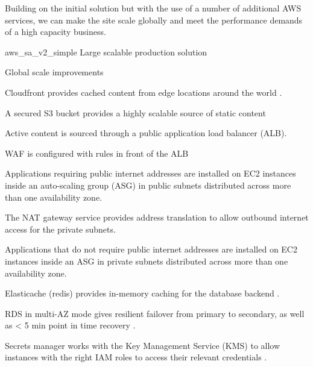 
	
Building on the initial solution but with the use of a number of additional AWS services, we can make the site scale globally and meet the performance demands of a high capacity business.
	

\architecture
{aws_sa_v2_simple}
{Large scalable production solution}

\changes
{Global scale improvements}
{
\item \label{item:aws_sa_v2_simple_cloudfront} Cloudfront provides cached content from edge locations around the world \cite{cfn-api}. 
\item \label{item:aws_sa_v2_simple_s3_origin} A secured S3 bucket provides a highly scalable source of static content
\item \label{item:aws_sa_v2_simple_alb} Active content is sourced through a public application load balancer (ALB).
\item \label{item:aws_sa_v2_simple_waf} WAF is configured with rules in front of the ALB \cite{ AWS-shield, waf-apiref, waf-dg}
\item \label{item:aws_sa_v2_simple_azs} Applications requiring public internet addresses are installed on EC2 instances inside an auto-scaling group (ASG) in public subnets distributed across more than one availability zone.
\item \label{item:aws_sa_v2_simple_nat} The NAT gateway service provides address translation to allow outbound internet access for the private subnets.
\item \label{item:aws_sa_v2_simple_private} Applications that do not require public internet addresses are installed on EC2 instances inside an ASG in private subnets distributed across more than one availability zone.
\item \label{item:aws_sa_v2_simple_elasticache} Elasticache (redis) provides in-memory caching for the database backend \cite{redis-ug}.
\item \label{item:aws_sa_v2_simple_rds} RDS in multi-AZ mode gives resilient failover from primary to secondary, as well as < 5 min point in time recovery \cite{rds-api}.
\item \label{item:aws_sa_v2_simple_secrets} Secrets manager works with the Key Management Service (KMS) to allow instances with the right IAM roles to access their relevant credentials \cite{secretsmanager-userguide}.
}


